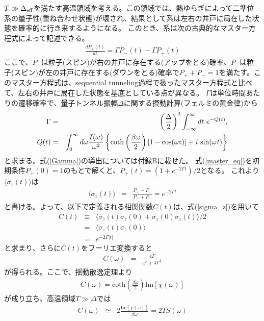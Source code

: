$T\gg\Delta_{\rm eff}$を満たす高温領域を考える。この領域では、熱ゆらぎによって二準位系の量子性(重ね合わせ状態)が壊され、結果として系は左右の井戸に局在した状態を確率的に行き来するようになる。
このとき、系は次の古典的なマスター方程式によって記述できる。
\begin{eqnarray}
	\frac{dP_+(t)}{dt}=\Gamma P_-(t) - \Gamma P_+(t) 
	\label{master_eq}
\end{eqnarray}
ここで、${P}_+$は粒子(スピン)が右の井戸に存在する(アップをとる)確率、${P}_-$は粒子(スピン)が左の井戸に存在する(ダウンをとる)確率で$P_++P_-=1$を満たす。このマスター方程式は、sequential tunneling過程で扱ったマスター方程式と比べて、左右の井戸に局在した状態を基底としている点が異なる。
$\Gamma$は単位時間あたりの遷移確率で、量子トンネル振幅$\Delta$に関する摂動計算(フェルミの黄金律)から
\begin{eqnarray}
	\Gamma&=&\left({\frac{\Delta}{2}}\right)^2\int_{-\infty}^{\infty}dt \ e^{-Q(t)},\label{Gamma} \\
	Q(t)&=&\int_{0}^{\infty}d\omega \frac{I(\omega)}{\omega^2}\left \{ \mathrm{coth\left(\frac{\beta \omega}{2}\right)[1-\mathrm{cos}(\omega t)]+\it{i} \ \mathrm{ sin}(\omega t)}\right \}
\end{eqnarray}
と求まる\cite{Leggett87}。式(\ref{Gamma})の導出については付録Bに載せた。
式(\ref{master_eq})を初期条件$P_+(0)=1$のもとで解くと、$P_+(t)=(1+e^{-2\Gamma t})/2$となる。
これより$\langle \sigma_z (t) \rangle$は
\begin{eqnarray}
	\langle\sigma_z(t)\rangle&=&\frac{P_+-P_-}{P_++P_-} =e^{-2\Gamma t}
	\label{sigma_z}
\end{eqnarray}
と書ける。よって、以下で定義される相関関数$C(t)$は、式(\ref{sigma_z})を用いて
\begin{eqnarray}
	C(t)&\equiv&\langle\sigma_z(t)\sigma_z(0)+\sigma_z(0)\sigma_z(t)\rangle/2\\
	&=&\langle \sigma_z(t) \sigma_z(0) \rangle\\
	&=&e^{-2\Gamma|t|}
\end{eqnarray}
と求まり、さらに$C(t)$をフーリエ変換すると
\begin{eqnarray}
	C(\omega)&=&\frac{4\Gamma}{\omega^2+4 \Gamma^2}
\end{eqnarray}
が得られる。ここで、揺動散逸定理より
\begin{eqnarray}
	C(\omega)=\mathrm{coth}\left(\frac{\beta\omega}{2}\right)\mathrm{Im}[\chi(\omega)]
\end{eqnarray}
が成り立ち、高温領域$T\gg\Delta$では
\begin{eqnarray}
	C(\omega)&\simeq& 2\frac{\mathrm{Im}[\chi(\omega)]}{\beta \omega}=2TS(\omega)\\
\end{eqnarray}
